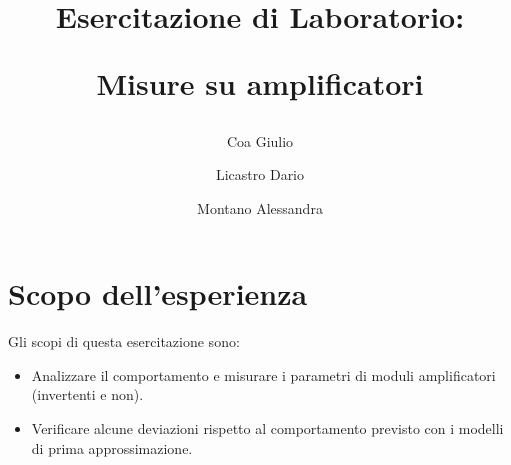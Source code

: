 \documentclass[a4paper]{article}
\title{
	\begin{center}
		Esercitazione di Laboratorio:
	\end{center}
	\newline
	\begin{center}
		Misure su amplificatori
	\end{center}
}
\author{
	Coa Giulio
	\and
	Licastro Dario
	\and
	Montano Alessandra
}
\begin{document}
	\begin{titlingpage}
		\maketitle
	\end{titlingpage}
	\newpage
	\section{Scopo dell'esperienza}
		Gli scopi di questa esercitazione sono:
		\begin{itemize}
			\item Analizzare il comportamento e misurare i parametri di moduli amplificatori (invertenti e non).
			\item Verificare alcune deviazioni rispetto al comportamento previsto con i modelli di prima approssimazione.
		\end{itemize}
\end{document}
